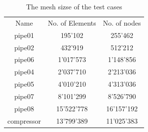 \documentclass[3p,times]{elsarticle}
\begin{document}
\begin{table}
	\centering
		\begin{tabular} {|c|c|c|}
			\hline
			Name & No. of Elements & No. of nodes \\			
			pipe01 & 195'102 & 255'462 \\ \hline
			pipe02 & 432'919 & 512'212 \\ \hline
			pipe06 & 1'017'573 & 1'148'856 \\ \hline
			pipe04 & 2'037'710 & 2'213'036 \\ \hline
			pipe05 & 4'010'210 & 4'313'036 \\ \hline			
			pipe07 & 8'101'299 & 8'526'790 \\ \hline
			pipe08 & 15'522'778 & 16'157'192 \\ \hline
			compressor & 13'799'389  & 11'025'383 \\ \hline
		\end{tabular}
	\caption{The mesh sizse of the test cases}
	\label{tab:MeshSize}
\end{table}
\end{document}

